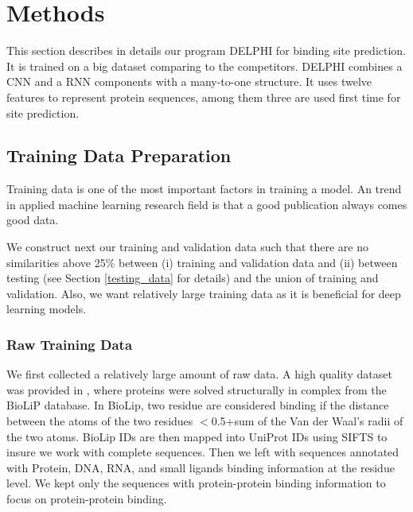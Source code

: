 \section{Methods}
This section describes in details our program DELPHI for binding site prediction. It is trained on a big dataset comparing to the competitors. DELPHI combines a CNN and a RNN components with a many-to-one structure. It uses twelve features to represent protein sequences, among them three are used first time for site prediction. 

\subsection{Training Data Preparation}
Training data is one of the most important factors in training a model. An trend in applied machine learning research field is that a good publication always comes good data. 

We construct next our training and validation data such that there are no similarities above 25\% between (i) training and validation data and (ii) between testing (see Section \ref{testing_data} for details) and the union of training and validation. Also, we want relatively large training data as it is beneficial for deep learning models.
    
\subsubsection{Raw Training Data}
We first collected a relatively large amount of raw data. A high quality dataset was provided in \cite{zhang2019comprehensive}, where proteins were solved structurally in complex from the BioLiP \cite{yang2012biolip} database. In BioLip, two residue are considered binding if the distance between the atoms of the 
two residues $<$0.5+sum of the Van der Waal's radii of the two atoms. BioLip IDs are then mapped into UniProt IDs using SIFTS \cite{velankar2012sifts} to insure we work with complete sequences. Then we left with sequences annotated with Protein, DNA, RNA, and small ligands binding information at the residue level. We kept only the sequences with protein-protein binding information to focus on protein-protein binding.
